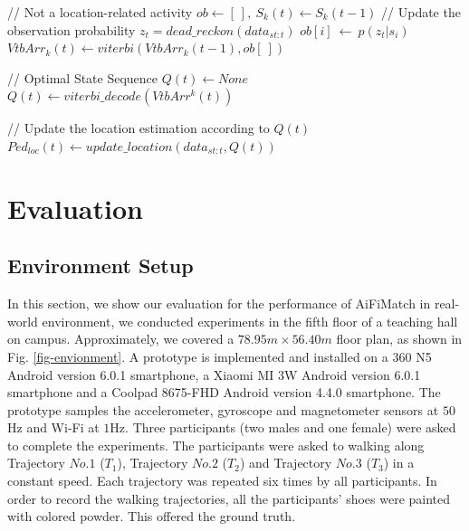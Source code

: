 \documentclass{llncs}
\begin{document}
\begin{algorithm}
	\begin{algorithmic}[1]
				
		\ELSE // Not a location-related activity
		\STATE $ob \leftarrow [\ ],\ S_{k}(t) \leftarrow S_{k}(t-1)$
		\STATE // Update the observation probability
		\STATE ${z_t}=dead\_reckon(data_{st:t})$
		\STATE $ob[i]\ \leftarrow\ p(z_t|s_i)$
		\ENDFOR
		\STATE ${VtbArr}_{k}(t) \leftarrow viterbi({VtbArr}_{k}(t-1), ob[\ ])$
		\ENDIF	

		\STATE // Optimal State Sequence
		\STATE ${Q(t)} \leftarrow None$
		\STATE ${Q(t)} \leftarrow viterbi\_decode(VtbArr^{k}(t))$
		\ENDIF
		
		\STATE // Update the location estimation according to $Q(t)$
		\STATE $Ped_{loc}(t) \leftarrow update\_location(data_{st:t}, Q(t))$
	\end{algorithmic}
\end{algorithm}

\section{Evaluation}

\subsection{Environment Setup}

In this section, we show our evaluation for the performance of AiFiMatch in real-world environment, we conducted experiments in the fifth floor of a teaching hall on campus. Approximately, we covered a $78.95m \times 56.40m$ floor plan, as shown in Fig. \ref{fig-envionment}. A prototype is implemented and installed on a 360 N5 Android version 6.0.1 smartphone, a Xiaomi MI 3W Android version 6.0.1 smartphone and a Coolpad 8675-FHD Android version 4.4.0 smartphone. The prototype samples the accelerometer, gyroscope and magnetometer sensors at $50$Hz and Wi-Fi at $1$Hz. Three participants (two males and one female) were asked to complete the experiments. The participants were asked to walking along Trajectory $No.1$ ($T_1$), Trajectory $No.2$ ($T_2$) and Trajectory $No.3$ ($T_3$) in a constant speed. Each trajectory was repeated six times by all participants. In order to record the walking trajectories, all the participants' shoes were painted with colored powder. This offered the ground truth.
\end{document}

